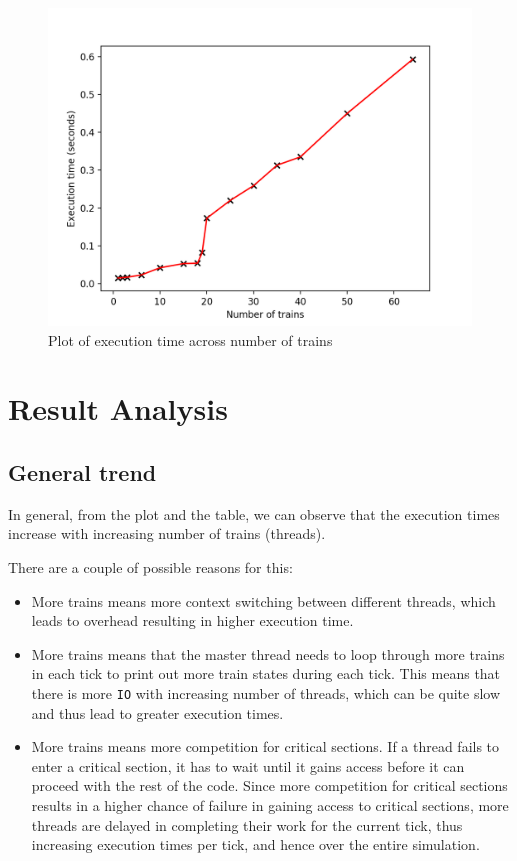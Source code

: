 \documentclass[12pt]{article}
\begin{document}
\begin{figure}
	\includegraphics{execution_times}
	\caption{Plot of execution time across number of trains}
\end{figure}

\section{Result Analysis}

\subsection{General trend}

In general, from the plot and the table, we can observe that the execution times increase with increasing number of trains (threads). 

\bigbreak \noindent There are a couple of possible reasons for this:
\begin{itemize}
	\item More trains means more context switching between different threads, which leads to overhead resulting in higher execution time.
	\item More trains means that the master thread needs to loop through more trains in each tick to print out more train states during each tick. This means that there is more \verb!IO! with increasing number of threads, which can be quite slow and thus lead to greater execution times.
	\item More trains means more competition for critical sections. If a thread fails to enter a critical section, it has to wait until it gains access before it can proceed with the rest of the code. Since more competition for critical sections results in a higher chance of failure in gaining access to critical sections, more threads are delayed in completing their work for the current tick, thus increasing execution times per tick, and hence over the entire simulation.
\end{itemize}
\end{document}
